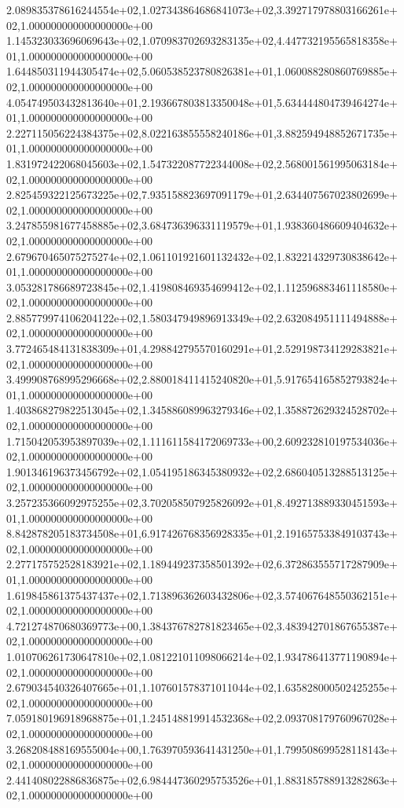 2.089835378616244554e+02,1.027343864686841073e+02,3.392717978803166261e+02,1.000000000000000000e+00
1.145323033696069643e+02,1.070983702693283135e+02,4.447732195565818358e+01,1.000000000000000000e+00
1.644850311944305474e+02,5.060538523780826381e+01,1.060088280860769885e+02,1.000000000000000000e+00
4.054749503432813640e+01,2.193667803813350048e+01,5.634444804739464274e+01,1.000000000000000000e+00
2.227115056224384375e+02,8.022163855558240186e+01,3.882594948852671735e+01,1.000000000000000000e+00
1.831972422068045603e+02,1.547322087722344008e+02,2.568001561995063184e+02,1.000000000000000000e+00
2.825459322125673225e+02,7.935158823697091179e+01,2.634407567023802699e+02,1.000000000000000000e+00
3.247855981677458885e+02,3.684736396331119579e+01,1.938360486609404632e+02,1.000000000000000000e+00
2.679670465075275274e+02,1.061101921601132432e+02,1.832214329730838642e+01,1.000000000000000000e+00
3.053281786689723845e+02,1.419808469354699412e+02,1.112596883461118580e+02,1.000000000000000000e+00
2.885779974106204122e+02,1.580347949896913349e+02,2.632084951111494888e+02,1.000000000000000000e+00
3.772465484131838309e+01,4.298842795570160291e+01,2.529198734129283821e+02,1.000000000000000000e+00
3.499908768995296668e+02,2.880018411415240820e+01,5.917654165852793824e+01,1.000000000000000000e+00
1.403868279822513045e+02,1.345886089963279346e+02,1.358872629324528702e+02,1.000000000000000000e+00
1.715042053953897039e+02,1.111611584172069733e+00,2.609232810197534036e+02,1.000000000000000000e+00
1.901346196373456792e+02,1.054195186345380932e+02,2.686040513288513125e+02,1.000000000000000000e+00
3.257235366092975255e+02,3.702058507925826092e+01,8.492713889330451593e+01,1.000000000000000000e+00
8.842878205183734508e+01,6.917426768356928335e+01,2.191657533849103743e+02,1.000000000000000000e+00
2.277175752528183921e+02,1.189449237358501392e+02,6.372863555717287909e+01,1.000000000000000000e+00
1.619845861375437437e+02,1.713896362603432806e+02,3.574067648550362151e+02,1.000000000000000000e+00
4.721274870680369773e+00,1.384376782781823465e+02,3.483942701867655387e+02,1.000000000000000000e+00
1.010706261730647810e+02,1.081221011098066214e+02,1.934786413771190894e+02,1.000000000000000000e+00
2.679034540326407665e+01,1.107601578371011044e+02,1.635828000502425255e+02,1.000000000000000000e+00
7.059180196918968875e+01,1.245148819914532368e+02,2.093708179760967028e+02,1.000000000000000000e+00
3.268208488169555004e+00,1.763970593641431250e+01,1.799508699528118143e+02,1.000000000000000000e+00
2.441408022886836875e+02,6.984447360295753526e+01,1.883185788913282863e+02,1.000000000000000000e+00
